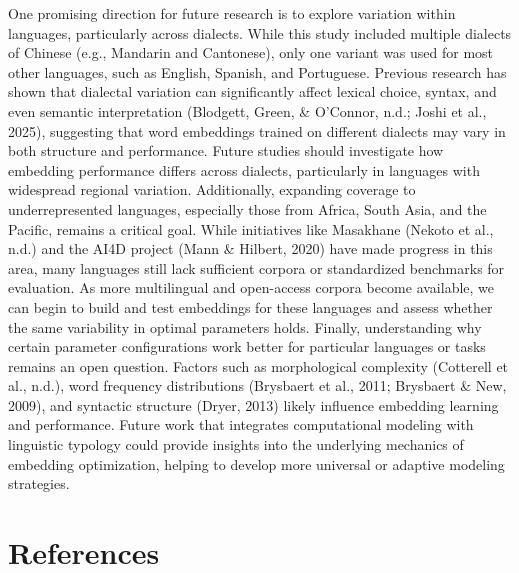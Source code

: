 \documentclass[
  man,floatsintext]{apa6}
\begin{document}
One promising direction for future research is to explore variation within languages, particularly across dialects. While this study included multiple dialects of Chinese (e.g., Mandarin and Cantonese), only one variant was used for most other languages, such as English, Spanish, and Portuguese. Previous research has shown that dialectal variation can significantly affect lexical choice, syntax, and even semantic interpretation (Blodgett, Green, \& O'Connor, n.d.; Joshi et al., 2025), suggesting that word embeddings trained on different dialects may vary in both structure and performance. Future studies should investigate how embedding performance differs across dialects, particularly in languages with widespread regional variation. Additionally, expanding coverage to underrepresented languages, especially those from Africa, South Asia, and the Pacific, remains a critical goal. While initiatives like Masakhane (Nekoto et al., n.d.) and the AI4D project (Mann \& Hilbert, 2020) have made progress in this area, many languages still lack sufficient corpora or standardized benchmarks for evaluation. As more multilingual and open-access corpora become available, we can begin to build and test embeddings for these languages and assess whether the same variability in optimal parameters holds. Finally, understanding why certain parameter configurations work better for particular languages or tasks remains an open question. Factors such as morphological complexity (Cotterell et al., n.d.), word frequency distributions (Brysbaert et al., 2011; Brysbaert \& New, 2009), and syntactic structure (Dryer, 2013) likely influence embedding learning and performance. Future work that integrates computational modeling with linguistic typology could provide insights into the underlying mechanics of embedding optimization, helping to develop more universal or adaptive modeling strategies.

\newpage

\section{References}\label{references}
\end{document}
